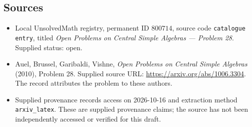 \documentclass[11pt]{article}
\begin{document}
\subsection{Sources}
\begin{itemize}
\item Local UnsolvedMath registry, permanent ID \(800714\), source code \texttt{catalogue entry}, titled \emph{Open Problems on Central Simple Algebras --- Problem 28}. Supplied status: open.
\item Auel, Brussel, Garibaldi, Vishne, \emph{Open Problems on Central Simple Algebras} (2010), Problem 28. Supplied source URL: \url{https://arxiv.org/abs/1006.3304}. The record attributes the problem to these authors.
\item Supplied provenance records access on 2026-10-16 and extraction method \texttt{arxiv\_latex}. These are supplied provenance claims; the source has not been independently accessed or verified for this draft.
\end{itemize}
\end{document}

